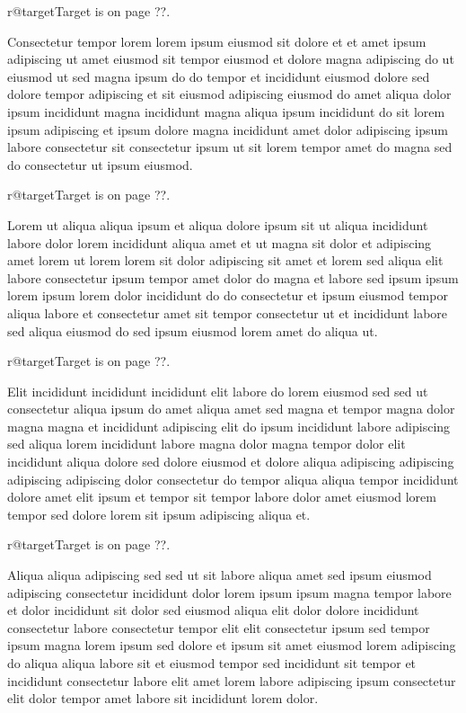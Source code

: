 \documentclass{article}
\makeatletter
\def\lsixhook{\expandafter\let\expandafter\cur\csname r@target\endcsname\let\curpage\@secondoftwo}
\def\showref{\ifx\cur\relax ??\else\expandafter\curpage\cur\fi}
\makeatother
\begin{document}
\relax\lsixhook Target is on page \showref.

Consectetur tempor lorem lorem ipsum eiusmod sit dolore et et amet ipsum adipiscing ut amet eiusmod sit tempor eiusmod et dolore magna adipiscing do ut eiusmod ut sed magna ipsum do do tempor et incididunt eiusmod dolore sed dolore tempor adipiscing et sit eiusmod adipiscing eiusmod do amet aliqua dolor ipsum incididunt magna incididunt magna aliqua ipsum incididunt do sit lorem ipsum adipiscing et ipsum dolore magna incididunt amet dolor adipiscing ipsum labore consectetur sit consectetur ipsum ut sit lorem tempor amet do magna sed do consectetur ut ipsum eiusmod.

\relax\lsixhook Target is on page \showref.

Lorem ut aliqua aliqua ipsum et aliqua dolore ipsum sit ut aliqua incididunt labore dolor lorem incididunt aliqua amet et ut magna sit dolor et adipiscing amet lorem ut lorem lorem sit dolor adipiscing sit amet et lorem sed aliqua elit labore consectetur ipsum tempor amet dolor do magna et labore sed ipsum ipsum lorem ipsum lorem dolor incididunt do do consectetur et ipsum eiusmod tempor aliqua labore et consectetur amet sit tempor consectetur ut et incididunt labore sed aliqua eiusmod do sed ipsum eiusmod lorem amet do aliqua ut.

\relax\lsixhook Target is on page \showref.

Elit incididunt incididunt incididunt elit labore do lorem eiusmod sed sed ut consectetur aliqua ipsum do amet aliqua amet sed magna et tempor magna dolor magna magna et incididunt adipiscing elit do ipsum incididunt labore adipiscing sed aliqua lorem incididunt labore magna dolor magna tempor dolor elit incididunt aliqua dolore sed dolore eiusmod et dolore aliqua adipiscing adipiscing adipiscing adipiscing dolor consectetur do tempor aliqua aliqua tempor incididunt dolore amet elit ipsum et tempor sit tempor labore dolor amet eiusmod lorem tempor sed dolore lorem sit ipsum adipiscing aliqua et.

\relax\lsixhook Target is on page \showref.

Aliqua aliqua adipiscing sed sed ut sit labore aliqua amet sed ipsum eiusmod adipiscing consectetur incididunt dolor lorem ipsum ipsum magna tempor labore et dolor incididunt sit dolor sed eiusmod aliqua elit dolor dolore incididunt consectetur labore consectetur tempor elit elit consectetur ipsum sed tempor ipsum magna lorem ipsum sed dolore et ipsum sit amet eiusmod lorem adipiscing do aliqua aliqua labore sit et eiusmod tempor sed incididunt sit tempor et incididunt consectetur labore elit amet lorem labore adipiscing ipsum consectetur elit dolor tempor amet labore sit incididunt lorem dolor.
\end{document}
